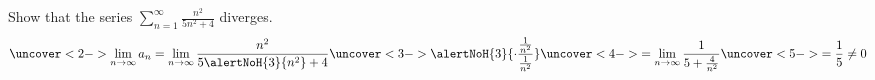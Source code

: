 \begin{frame}
\begin{example} %
Show that the series $\sum_{n=1}^\infty \frac{n^2}{5n^2+4}$ diverges.
\[
\uncover<2->{%
\lim_{n\to\infty} a_n = \lim_{n\to\infty} \frac{n^2}{5\alertNoH{ 3}{n^2}+4}\uncover<3->{\alertNoH{ 3}{\cdot \frac{\frac{1}{n^2}}{\frac{1}{n^2}}}}%
}%
\uncover<4->{%
 = \lim_{n\to\infty} \frac{1}{5+\frac{4}{n^2}} %
}%
\uncover<5->{%
 = \frac{1}{5} \neq 0%
}%
\]
%
\end{example}
\end{frame}
